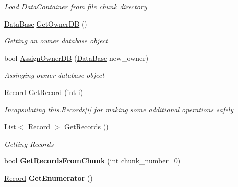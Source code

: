 \begin{DoxyCompactItemize}
\begin{DoxyCompactList}\small\item\em Load \hyperlink{class_dwarf_d_b_1_1_data_structures_1_1_data_container}{Data\+Container} from file chunk directory \end{DoxyCompactList}\item 
\hyperlink{class_dwarf_d_b_1_1_data_structures_1_1_data_base}{Data\+Base} \hyperlink{class_dwarf_d_b_1_1_data_structures_1_1_data_container_a30765f0c417065245bb4c065c7eb29e0}{Get\+Owner\+D\+B} ()
\begin{DoxyCompactList}\small\item\em Getting an owner database object \end{DoxyCompactList}\item 
bool \hyperlink{class_dwarf_d_b_1_1_data_structures_1_1_data_container_aeac4bb0b67fdcba42ea4933a03f295c3}{Assign\+Owner\+D\+B} (\hyperlink{class_dwarf_d_b_1_1_data_structures_1_1_data_base}{Data\+Base} new\+\_\+owner)
\begin{DoxyCompactList}\small\item\em Assinging owner database object \end{DoxyCompactList}\item 
\hyperlink{class_dwarf_d_b_1_1_data_structures_1_1_record}{Record} \hyperlink{class_dwarf_d_b_1_1_data_structures_1_1_data_container_afdcd349b09fa679ea11d0a04e073e965}{Get\+Record} (int i)
\begin{DoxyCompactList}\small\item\em Incapsulating this.\+Records\mbox{[}i\mbox{]} for making some additional operations safely \end{DoxyCompactList}\item 
List$<$ \hyperlink{class_dwarf_d_b_1_1_data_structures_1_1_record}{Record} $>$ \hyperlink{class_dwarf_d_b_1_1_data_structures_1_1_data_container_ab9691aa5445b0069bb30c4d7a9f6139c}{Get\+Records} ()
\begin{DoxyCompactList}\small\item\em Getting Records \end{DoxyCompactList}\item 
\hypertarget{class_dwarf_d_b_1_1_data_structures_1_1_data_container_ad72368f523f462dd3baee29e6ba4da66}{bool {\bfseries Get\+Records\+From\+Chunk} (int chunk\+\_\+number=0)}\label{class_dwarf_d_b_1_1_data_structures_1_1_data_container_ad72368f523f462dd3baee29e6ba4da66}

\item 
\hypertarget{class_dwarf_d_b_1_1_data_structures_1_1_data_container_aaea9c8cb3180484e56d0f6b47f90b23c}{\hyperlink{class_dwarf_d_b_1_1_data_structures_1_1_record}{Record} {\bfseries Get\+Enumerator} ()}\label{class_dwarf_d_b_1_1_data_structures_1_1_data_container_aaea9c8cb3180484e56d0f6b47f90b23c}


\end{DoxyCompactItemize}
